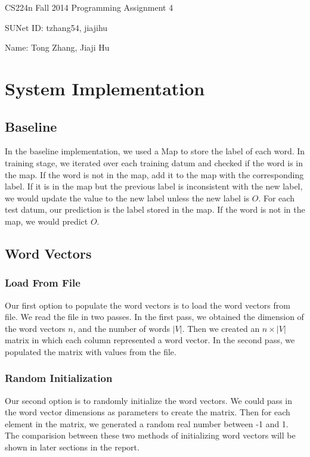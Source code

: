 \documentclass[12pt]{article}
\begin{document}
\begin{center}
{\Large CS224n Fall 2014 Programming Assignment 4}
\vspace{12pt}

SUNet ID: tzhang54, jiajihu

Name: Tong Zhang, Jiaji Hu
\vspace{12pt}
\end{center}

\section{System Implementation}

\subsection{Baseline}
In the baseline implementation, we used a Map to store the label of each word. In training stage, we iterated over each training datum and checked if the word is in the map. If the word is not in the map, add it to the map with the corresponding label. If it is in the map but the previous label is inconsistent with the new label, we would update the value to the new label unless the new label is $O$. For each test datum, our prediction is the label stored in the map. If the word is not in the map, we would predict $O$.

\subsection{Word Vectors}

\subsubsection{Load From File}
Our first option to populate the word vectors is to load the word vectors from file. We read the file in two passes. In the first pass, we obtained the dimension of the word vectors $n$, and the number of words $|V|$. Then we created an ${n}\times{|V|}$ matrix in which each column represented a word vector. In the second pass, we populated the matrix with values from the file.


\subsubsection{Random Initialization}
Our second option is to randomly initialize the word vectors. We could pass in the word vector dimensions as parameters to create the matrix. Then for each element in the matrix, we generated a random real number between -1 and 1.\\
The comparision between these two methods of initializing word vectors will be shown in later sections in the report.
\end{document}
